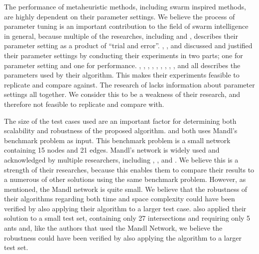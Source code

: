 The performance of metaheuristic methods, including swarm inspired methods, are highly dependent on their parameter settings. We believe the process of parameter tuning is an important contribution to the field of swarm intelligence in general, because multiple of the researches, including \citet{salehi-nezhad07} and \citet{yang07}, describes their parameter setting as a product of ``trial and error''. \citet{sedighpour14}, \citet{poorzahedy11}, and \citet{kechagiopoulos14} discussed and justified their parameter settings by conducting their experiments in two parts; one for parameter setting and one for performance. \citet{hsiao04}, \citet{salehi-nezhad07}, \citet{tripathi09}, \citet{sedighpour14}, \citet{yang07}, \citet{salehinejad10}, \citet{jiang10}, \citet{poorzahedy11}, \citet{nikolic14}, and \citet{kechagiopoulos14} all describes the parameters used by their algorithm. This makes their experiments feasible to replicate and compare against. The research of \citet{dias14} lacks information about parameter settings all together. We consider this to be a weakness of their research, and therefore not feasible to replicate and compare with. \newline

The size of the test cases used are an important factor for determining both scalability and robustness of the proposed algorithm. \citet{nikolic14} and \citet{kechagiopoulos14} both uses Mandl's benchmark problem as input. This benchmark problem is a small network containing 15 nodes and 21 edges.  Mandl's network is widely used and acknowledged by multiple researchers, including \citet{baaj91}, \citet{chakroborty02}, and \citet{fan09}. We believe this is a strength of their researches, because this enables them to compare their results to a numerous of other solutions using the same benchmark problem. However, as mentioned, the Mandl network is quite small. We believe that the robustness of their algorithms regarding both time and space complexity could have been verified by also applying their algorithm to a larger test case.\citet{salehi-nezhad07} also applied their solution to a small test set, containing only 27 intersections and requiring only 5 ants and, like the authors that used the Mandl Network, we believe the robustness could have been verified by also applying the algorithm to a larger test set.  \newline

